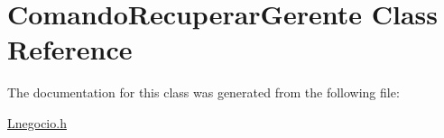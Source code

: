 \hypertarget{class_comando_recuperar_gerente}{}\section{Comando\+Recuperar\+Gerente Class Reference}
\label{class_comando_recuperar_gerente}


The documentation for this class was generated from the following file\+:\begin{DoxyCompactItemize}
\item 
\hyperlink{_lnegocio_8h}{Lnegocio.\+h}\end{DoxyCompactItemize}
